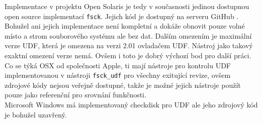 Implementace v projektu Open Solaris je tedy v současnosti jedinou dostupnou open source implementací \texttt{fsck}. Jejich kód je dostupný na serveru GitHub \cite{solaris-github}. Bohužel ani jejich implementace není kompletní a dokáže obnovit pouze volné místo a strom souborového systému ale bez dat. Dalším omezením je maximální verze UDF, která je omezena na verzi 2.01 ovladačem UDF. Nástroj jako takový exaktní omezení verze nemá. Ovšem i toto je dobrý výchozí bod pro další práci.\\
Co se týká OSX od společnosti Apple, ti mají nástroje pro kontrolu UDF implementovanou v nástroji \texttt{fsck\_udf} pro všechny exitující revize, ovšem zdrojové kódy nejsou veřejně dostupné, takže je možné jejich nástroje použít pouze jako referenční pro srovnání funkčnosti.\\
Microsoft Windows má implementovaný checkdisk pro UDF ale jeho zdrojový kód je bohužel uzavřený.\\

